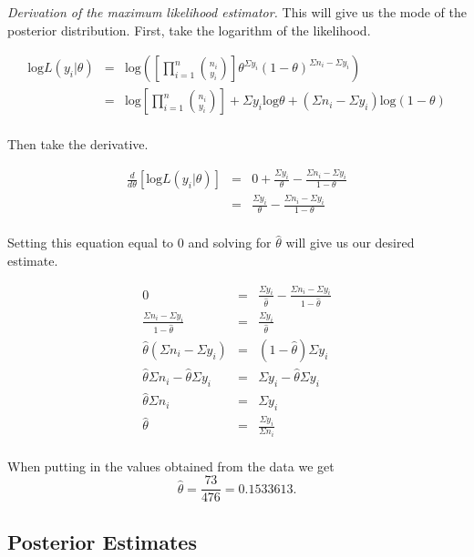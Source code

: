 \documentclass[12pt]{article}
\begin{document}
\noindent \textit{Derivation of the maximum likelihood estimator.}  This will give us the mode of the posterior distribution.  First, take the logarithm of the likelihood.

\begin{eqnarray*}
\mathrm{log}L(y_i|\theta)&=& \mathrm{log}\left(\left[\prod_{i=1}^n{n_i \choose y_i}\right]\theta^{\Sigma y_i}(1-\theta)^{\Sigma n_i-\Sigma y_i}\right) \\
&=& \mathrm{log}\left[\prod_{i=1}^n{n_i \choose y_i}\right]+\Sigma y_i\mathrm{log}\theta+(\Sigma n_i-\Sigma y_i)\mathrm{log}(1-\theta) \\
\end{eqnarray*}

\noindent Then take the derivative.  

\begin{eqnarray*}
\frac{d}{d\theta}\left[\mathrm{log}L(y_i|\theta)\right] &=& 0 + \frac{\Sigma y_i}{\theta} - \frac{\Sigma n_i-\Sigma y_i}{1-\theta} \\
&=& \frac{\Sigma y_i}{\theta} - \frac{\Sigma n_i-\Sigma y_i}{1-\theta} \\
\end{eqnarray*}

\noindent Setting this equation equal to 0 and solving for $\hat{\theta}$ will give us our desired estimate.

\begin{eqnarray*}
0 &=& \frac{\Sigma y_i}{\hat{\theta}} - \frac{\Sigma n_i-\Sigma y_i}{1-\hat{\theta}}\\
\frac{\Sigma n_i-\Sigma y_i}{1-\hat{\theta}} &=& \frac{\Sigma y_i}{\hat{\theta}} \\
\hat{\theta}(\Sigma n_i-\Sigma y_i) &=& (1-\hat{\theta})\Sigma y_i \\
\hat{\theta}\Sigma n_i - \hat{\theta}\Sigma y_i &=& \Sigma y_i -\hat{\theta}\Sigma y_i \\
\hat{\theta}\Sigma n_i &=& \Sigma y_i \\
\hat{\theta} &=& \frac{\Sigma y_i}{\Sigma n_i} \\
\end{eqnarray*}

\noindent When putting in the values obtained from the data we get
\[\hat{\theta}=\frac{73}{476}=0.1533613.\]



\subsection{Posterior Estimates}
\end{document}
